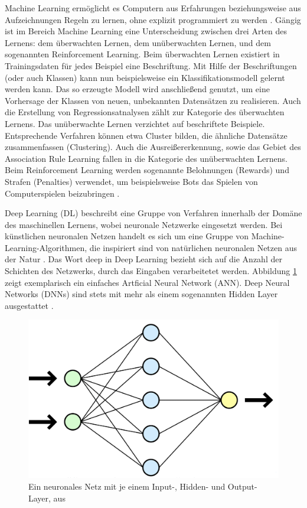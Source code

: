 Machine Learning ermöglicht es Computern aus Erfahrungen beziehungsweise aus Aufzeichnungen Regeln zu lernen, ohne explizit programmiert zu werden \cite{samuel}. Gängig ist im Bereich Machine Learning eine Unterscheidung zwischen drei Arten des Lernens: dem überwachten Lernen, dem unüberwachten Lernen, und dem sogenannten Reinforcement Learning. Beim überwachten Lernen existiert in Trainingsdaten für jedes Beispiel eine Beschriftung. Mit Hilfe der Beschriftungen (oder auch Klassen) kann nun beispielsweise ein Klassifikationsmodell gelernt werden kann. Das so erzeugte Modell wird anschließend genutzt, um eine Vorhersage der Klassen von neuen, unbekannten Datensätzen zu realisieren. Auch die Erstellung von Regressionsatnalysen zählt zur Kategorie des überwachten Lernens. Das unüberwachte Lernen verzichtet auf beschriftete Beispiele. Entsprechende Verfahren können etwa Cluster bilden, die ähnliche Datensätze zusammenfassen (Clustering). Auch die Ausreißererkennung, sowie das Gebiet des Association Rule Learning fallen in die Kategorie des unüberwachten Lernens. Beim Reinforcement Learning werden sogenannte Belohnungen (Rewards) und Strafen (Penalties) verwendet, um beispielsweise Bots das Spielen von Computerspielen beizubringen \cite[S. 7-15]{Geron}.

Deep Learning (DL) beschreibt eine Gruppe von Verfahren innerhalb der Domäne des maschinellen Lernens, wobei neuronale Netzwerke eingesetzt werden. Bei künstlichen neuronalen Netzen handelt es sich um eine Gruppe von Machine-Learning-Algorithmen, die inspiriert sind von natürlichen neuronalen Netzen aus der Natur \cite[S. 2]{White}. Das Wort deep in Deep Learning bezieht sich auf die Anzahl der Schichten des Netzwerks, durch das Eingaben verarbeitetet werden. Abbildung \ref{Abbildung:Nielsen} zeigt exemplarisch ein einfaches Artficial Neural Network (ANN). Deep Neural Networks (DNNs) sind stets mit mehr als einem sogenannten Hidden Layer ausgestattet \cite{Nielsen}. 

\begin{figure}[h]
\centering
\includegraphics[scale=0.5]{content/pics/Picture_3.png}
\caption{Ein neuronales Netz mit je einem Input-, Hidden- und Output-Layer, aus \cite{Nielsen}}
\label{Abbildung:Nielsen}
\end{figure}

